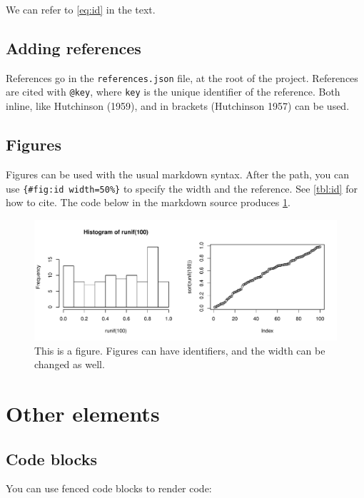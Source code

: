 \documentclass[12pt]{article}
\begin{document}
We can refer to \cref{eq:id} in the text.

\subsection{Adding references}\label{adding-references}

References go in the \lstinline!references.json! file, at the root of
the project. References are cited with \lstinline!@key!, where
\lstinline!key! is the unique identifier of the reference. Both inline,
like Hutchinson (1959), and in brackets (Hutchinson 1957) can be used.

\subsection{Figures}\label{figures}

Figures can be used with the usual markdown syntax. After the path, you
can use \lstinline!{#fig:id width=50%}! to specify the width and the
reference. See \cref{tbl:id} for how to cite. The code
below in the markdown source produces \cref{fig:id}.

\begin{figure}[htbp]
\centering
\includegraphics[width=1.00000\textwidth]{figure/histogram-1.pdf}
\caption{This is a figure. Figures can have identifiers, and the width
can be changed as well.\label{fig:id}}
\end{figure}

\section{Other elements}\label{other-elements}

\subsection{Code blocks}\label{code-blocks}

You can use fenced code blocks to render code:
\end{document}

